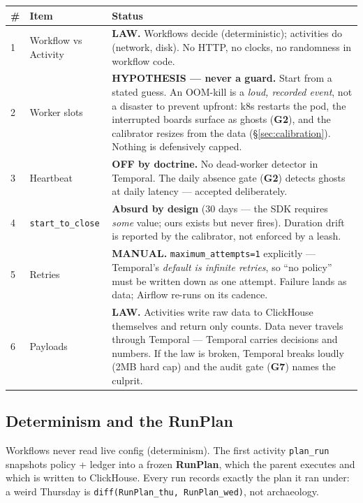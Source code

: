 \documentclass[11pt,a4paper]{article}
\newcommand{\gate}[1]{\textbf{\textcolor{red!60!black}{#1}}}
\newcommand{\law}[1]{\textbf{\textcolor{blue!50!black}{#1}}}
\begin{document}
\begin{center}
\begin{tabularx}{\textwidth}{@{}llX@{}}
\toprule
\# & Item & Status \\
\midrule
1 & Workflow vs Activity & \law{LAW.} Workflows decide (deterministic); activities do (network, disk).
No HTTP, no clocks, no randomness in workflow code. \\
2 & Worker slots & \textbf{HYPOTHESIS --- never a guard.} Start from a stated guess. An OOM-kill is a
\emph{loud, recorded event}, not a disaster to prevent upfront: k8s restarts the pod, the interrupted
boards surface as ghosts (\gate{G2}), and the calibrator resizes from the data
(\S\ref{sec:calibration}). Nothing is defensively capped. \\
3 & Heartbeat & \textbf{OFF by doctrine.} No dead-worker detector in Temporal. The daily absence gate
(\gate{G2}) detects ghosts at daily latency --- accepted deliberately. \\
4 & \texttt{start\_to\_close} & \textbf{Absurd by design} (30 days --- the SDK requires \emph{some} value;
ours exists but never fires). Duration drift is reported by the calibrator, not enforced by a leash. \\
5 & Retries & \textbf{MANUAL.} \texttt{maximum\_attempts=1} explicitly --- Temporal's \emph{default is
infinite retries}, so ``no policy'' must be written down as one attempt. Failure lands as data; Airflow
re-runs on its cadence. \\
6 & Payloads & \law{LAW.} Activities write raw data to ClickHouse themselves and return only counts. Data
never travels through Temporal --- Temporal carries decisions and numbers. If the law is broken, Temporal
breaks loudly (2MB hard cap) and the audit gate (\gate{G7}) names the culprit. \\
\bottomrule
\end{tabularx}
\end{center}

\subsection{Determinism and the RunPlan}
Workflows never read live config (determinism). The first activity \texttt{plan\_run} snapshots policy +
ledger into a frozen \textbf{RunPlan}, which the parent executes and which is written to ClickHouse.
Every run records exactly the plan it ran under: a weird Thursday is
\texttt{diff(RunPlan\_thu, RunPlan\_wed)}, not archaeology.
\end{document}
